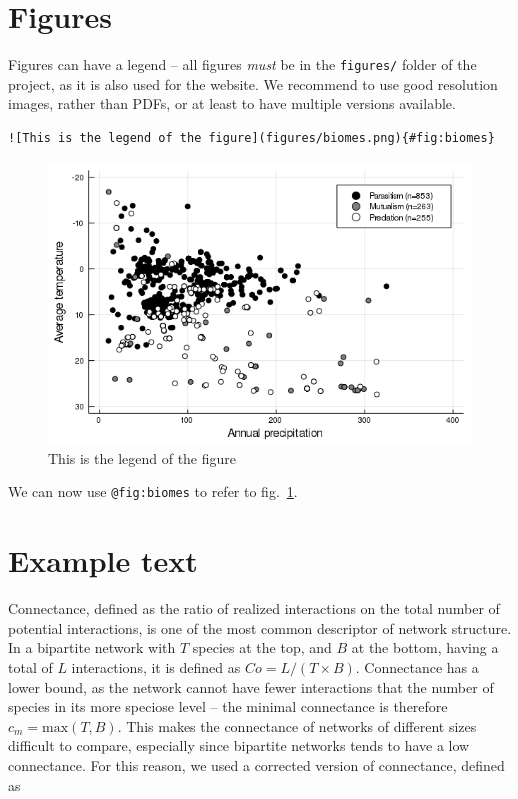 \documentclass[10pt,oneside]{article}
\makeatletter
\def\maxwidth{\ifdim\Gin@nat@width>\linewidth\linewidth
\else\Gin@nat@width\fi}
\let\Oldincludegraphics\includegraphics
\renewcommand{\includegraphics}[1]{\Oldincludegraphics[width=\maxwidth]{#1}}
\makeatother
\begin{document}
\hypertarget{figures}{%
\section{Figures}\label{figures}}

Figures can have a legend -- all figures \emph{must} be in the
\texttt{figures/} folder of the project, as it is also used for the
website. We recommend to use good resolution images, rather than PDFs,
or at least to have multiple versions available.

\begin{verbatim}
![This is the legend of the figure](figures/biomes.png){#fig:biomes}
\end{verbatim}

\begin{figure}
\hypertarget{fig:biomes}{%
\centering
\includegraphics{figures/biomes.png}
\caption{This is the legend of the figure}\label{fig:biomes}
}
\end{figure}

We can now use \texttt{@fig:biomes} to refer to fig.~\ref{fig:biomes}.

\hypertarget{example-text}{%
\section{Example text}\label{example-text}}

Connectance, defined as the ratio of realized interactions on the total
number of potential interactions, is one of the most common descriptor
of network structure. In a bipartite network with \(T\) species at the
top, and \(B\) at the bottom, having a total of \(L\) interactions, it
is defined as \(Co = L/(T\times B)\). Connectance has a lower bound, as
the network cannot have fewer interactions that the number of species in
its more speciose level -- the minimal connectance is therefore
\(c_m = \text{max}(T,B)\). This makes the connectance of networks of
different sizes difficult to compare, especially since bipartite
networks tends to have a low connectance. For this reason, we used a
corrected version of connectance, defined as
\end{document}
